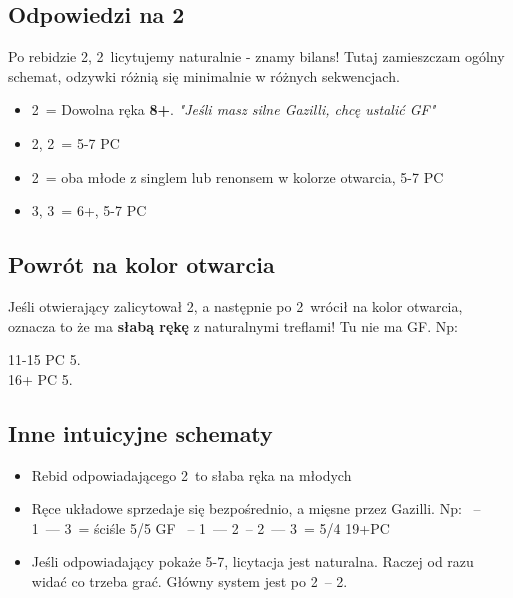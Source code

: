 \documentclass[12pt, a4paper]{article}
\begin{document}
\subsection*{Odpowiedzi na 2\clubs}
Po rebidzie 2\diams, 2\hearts\ licytujemy naturalnie - znamy bilans!
Tutaj zamieszczam ogólny schemat, odzywki różnią się minimalnie w różnych sekwencjach.
\begin{itemize}
    \item 2\diams\ = Dowolna ręka \textbf{8+}. \emph{"Jeśli masz silne Gazilli, chcę ustalić GF"}
    \item 2\hearts, 2\spades\ = 5-7 PC
    \item 2\nt\ = oba młode z singlem lub renonsem w kolorze otwarcia, 5-7 PC
    \item 3\clubs, 3\diams\ = 6+, 5-7 PC
\end{itemize}

\subsection*{Powrót na kolor otwarcia}
Jeśli otwierający zalicytował 2\clubs, a następnie po 2\diams\ wrócił na kolor otwarcia,
oznacza to że ma \textbf{słabą rękę} z naturalnymi treflami! Tu nie ma GF. Np:
\begin{center}
\webidding{1\spades\ & 1\nt \\ 2\clubs & 2\diams \\ 2\spades}
11-15 PC 5\clubs.
\\[1em] \webidding{1\spades\ & 1\nt \\ 2\clubs & 2\diams \\ 2\hearts}
16+ PC 5\hearts.
\end{center}


\subsection*{Inne intuicyjne schematy}
\begin{itemize}
    \item Rebid odpowiadającego 2\nt\ to słaba ręka na młodych
    \item Ręce układowe sprzedaje się bezpośrednio, a mięsne przez Gazilli. Np:
    \spades\ -- 1\nt\ --- 3\clubs\ = ściśle 5/5 GF
    \spades\ -- 1\nt\ --- 2\clubs\ -- 2\spades\ --- 3\clubs\ = 5/4 19+PC
    \item Jeśli odpowiadający pokaże 5-7, licytacja jest naturalna. Raczej od razu widać co trzeba grać.
    Główny system jest po 2\clubs\ -- 2\diams.
\end{itemize}
\end{document}
